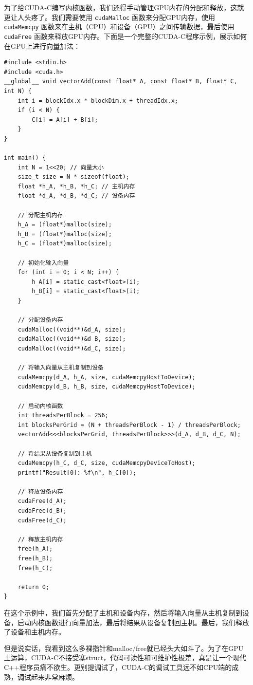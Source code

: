 为了给CUDA-C编写内核函数，我们还得手动管理GPU内存的分配和释放，这就更让人头疼了。我们需要使用 \verb|cudaMalloc| 函数来分配GPU内存，使用 \verb|cudaMemcpy| 函数来在主机（CPU）和设备（GPU）之间传输数据，最后使用 \verb|cudaFree| 函数来释放GPU内存。下面是一个完整的CUDA-C程序示例，展示如何在GPU上进行向量加法：
\begin{verbatim}
#include <stdio.h>
#include <cuda.h>
__global__ void vectorAdd(const float* A, const float* B, float* C, int N) {
    int i = blockIdx.x * blockDim.x + threadIdx.x;
    if (i < N) {
        C[i] = A[i] + B[i];
    }
}

int main() {
    int N = 1<<20; // 向量大小
    size_t size = N * sizeof(float);
    float *h_A, *h_B, *h_C; // 主机内存
    float *d_A, *d_B, *d_C; // 设备内存

    // 分配主机内存
    h_A = (float*)malloc(size);
    h_B = (float*)malloc(size);
    h_C = (float*)malloc(size);

    // 初始化输入向量
    for (int i = 0; i < N; i++) {
        h_A[i] = static_cast<float>(i);
        h_B[i] = static_cast<float>(i);
    }

    // 分配设备内存
    cudaMalloc((void**)&d_A, size);
    cudaMalloc((void**)&d_B, size);
    cudaMalloc((void**)&d_C, size);

    // 将输入向量从主机复制到设备
    cudaMemcpy(d_A, h_A, size, cudaMemcpyHostToDevice);
    cudaMemcpy(d_B, h_B, size, cudaMemcpyHostToDevice);

    // 启动内核函数
    int threadsPerBlock = 256;
    int blocksPerGrid = (N + threadsPerBlock - 1) / threadsPerBlock;
    vectorAdd<<<blocksPerGrid, threadsPerBlock>>>(d_A, d_B, d_C, N);

    // 将结果从设备复制到主机
    cudaMemcpy(h_C, d_C, size, cudaMemcpyDeviceToHost);
    printf("Result[0]: %f\n", h_C[0]);

    // 释放设备内存
    cudaFree(d_A);
    cudaFree(d_B);
    cudaFree(d_C);

    // 释放主机内存
    free(h_A);
    free(h_B);
    free(h_C);

    return 0;
}
\end{verbatim}
在这个示例中，我们首先分配了主机和设备内存，然后将输入向量从主机复制到设备，启动内核函数进行向量加法，最后将结果从设备复制回主机。最后，我们释放了设备和主机内存。

但是说实话，我看到这么多裸指针和malloc/free就已经头大如斗了。为了在GPU上运算，CUDA-C不接受塞struct，代码可读性和可维护性极差，真是让一个现代C++程序员痛不欲生。更别提调试了，CUDA-C的调试工具远不如CPU端的成熟，调试起来非常麻烦。

